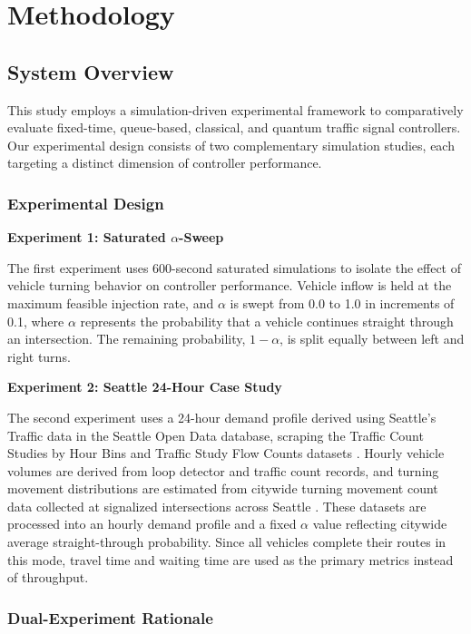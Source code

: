 \documentclass[12pt]{article}
\begin{document}
\section{Methodology}

\subsection{System Overview}

This study employs a simulation-driven experimental framework to comparatively evaluate fixed-time, queue-based, classical, and quantum traffic signal controllers. Our experimental design consists of two complementary simulation studies, each targeting a distinct dimension of controller performance.

\subsubsection{Experimental Design}

\textbf{Experiment 1: Saturated $\alpha$-Sweep}

The first experiment uses 600-second saturated simulations to isolate the effect of vehicle turning behavior on controller performance. Vehicle inflow is held at the maximum feasible injection rate, and $\alpha$ is swept from 0.0 to 1.0 in increments of 0.1, where $\alpha$ represents the probability that a vehicle continues straight through an intersection. The remaining probability, $1 - \alpha$, is split equally between left and right turns.

\textbf{Experiment 2: Seattle 24-Hour Case Study}

The second experiment uses a 24-hour demand profile derived using Seattle's Traffic data in the Seattle Open Data database, scraping the Traffic Count Studies by Hour Bins and Traffic Study Flow Counts datasets \cite{seattle_hourbins,seattle_flowcounts}. Hourly vehicle volumes are derived from loop detector and traffic count records, and turning movement distributions are estimated from citywide turning movement count data collected at signalized intersections across Seattle \cite{seattle_intersections}. These datasets are processed into an hourly demand profile and a fixed $\alpha$ value reflecting citywide average straight-through probability. Since all vehicles complete their routes in this mode, travel time and waiting time are used as the primary metrics instead of throughput.

\subsubsection{Dual-Experiment Rationale}
\end{document}
